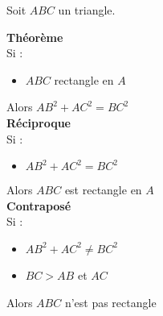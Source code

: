 {%
}


{Soit $ABC$ un triangle.\\
\begin{multicols}{3}
\textbf{Théorème}\\
    Si : 
\begin{itemize}
    \item $ABC$ rectangle en $A$
\end{itemize} 
Alors $AB^2+AC^2=BC^2$\\
\vfill\break
\textbf{Réciproque}\\
Si : 
\begin{itemize}
    \item $AB^2+AC^2=BC^2$
\end{itemize} 
Alors $ABC$ est rectangle en $A$\\
\vfill\break
\textbf{Contraposé}\\
Si : 
\begin{itemize}
    \item $AB^2+AC^2\neq BC^2$
    \item $BC>AB$ et $AC$
\end{itemize} 
Alors $ABC$ n'est pas rectangle
\end{multicols}
}


